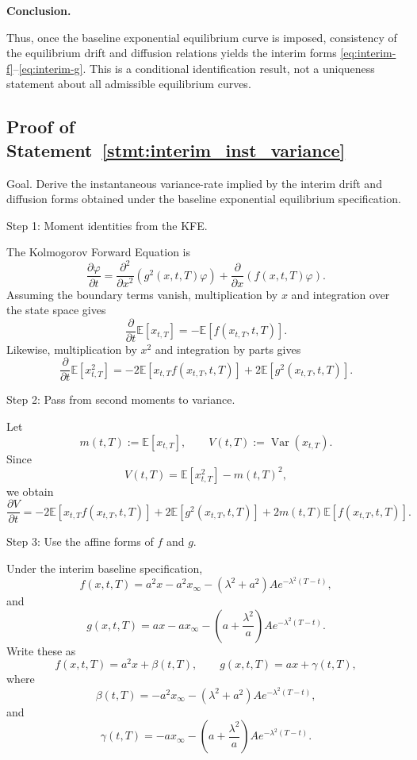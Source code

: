 \documentclass[12pt]{article}
\theoremstyle{statementstyle}
\begin{document}
\begin{appendices}
\medskip
\noindent\textbf{Conclusion.}

Thus, once the baseline exponential equilibrium curve is imposed,
consistency of the equilibrium drift and diffusion relations yields the
interim forms \eqref{eq:interim-f}--\eqref{eq:interim-g}. This is a
conditional identification result, not a uniqueness statement about all
admissible equilibrium curves.

\subsection{Proof of Statement~\ref{stmt:interim_inst_variance}}
\label{appendix:A6}

Goal. Derive the instantaneous variance-rate implied by the interim drift and diffusion
forms obtained under the baseline exponential equilibrium specification.

Step 1: Moment identities from the KFE.

The Kolmogorov Forward Equation is
\[
\frac{\partial \varphi}{\partial t}
=
\frac{\partial^2}{\partial x^2}\left(g^2(x,t,T)\varphi\right)
+
\frac{\partial}{\partial x}\left(f(x,t,T)\varphi\right).
\]
Assuming the boundary terms vanish, multiplication by \(x\) and integration over the
state space gives
\[
\frac{\partial}{\partial t}\mathbb E[x_{t,T}]
=
-\mathbb E[f(x_{t,T},t,T)].
\]
Likewise, multiplication by \(x^2\) and integration by parts gives
\[
\frac{\partial}{\partial t}\mathbb E[x_{t,T}^2]
=
-2\mathbb E[x_{t,T}f(x_{t,T},t,T)]
+
2\mathbb E[g^2(x_{t,T},t,T)].
\]

Step 2: Pass from second moments to variance.

Let
\[
m(t,T):=\mathbb E[x_{t,T}],
\qquad
V(t,T):=\operatorname{Var}(x_{t,T}).
\]
Since
\[
V(t,T)=\mathbb E[x_{t,T}^2]-m(t,T)^2,
\]
we obtain
\[
\frac{\partial V}{\partial t}
=
-2\mathbb E[x_{t,T}f(x_{t,T},t,T)]
+
2\mathbb E[g^2(x_{t,T},t,T)]
+
2m(t,T)\mathbb E[f(x_{t,T},t,T)].
\]

Step 3: Use the affine forms of \(f\) and \(g\).

Under the interim baseline specification,
\[
f(x,t,T)
=
a^2x
-
a^2x_\infty
-
(\lambda^2+a^2)Ae^{-\lambda^2(T-t)},
\]
and
\[
g(x,t,T)
=
ax
-
ax_\infty
-
\left(a+\frac{\lambda^2}{a}\right)Ae^{-\lambda^2(T-t)}.
\]
Write these as
\[
f(x,t,T)=a^2x+\beta(t,T),
\qquad
g(x,t,T)=ax+\gamma(t,T),
\]
where
\[
\beta(t,T)
=
-a^2x_\infty
-
(\lambda^2+a^2)Ae^{-\lambda^2(T-t)},
\]
and
\[
\gamma(t,T)
=
-ax_\infty
-
\left(a+\frac{\lambda^2}{a}\right)Ae^{-\lambda^2(T-t)}.
\]


\end{appendices}
\end{document}
